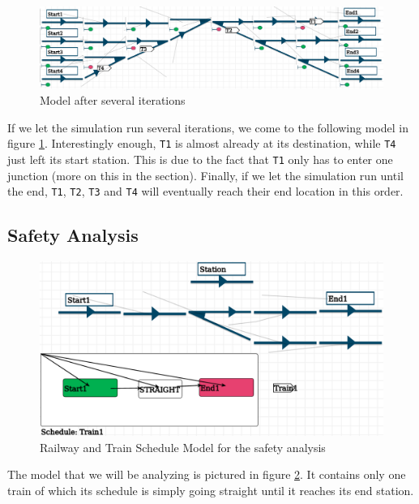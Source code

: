 \documentclass{article}
\begin{document}
\begin{figure}[H]
    \centering
    \includegraphics[width=\textwidth]{images/example_devs_after_few_iters.png}
    \caption{Model after several iterations}
    \label{example_devs_after_few_iters}
\end{figure}

If we let the simulation run several iterations, we come to the following model in figure \ref{example_devs_after_few_iters}. Interestingly enough, \texttt{T1} is almost already at its destination, while \texttt{T4} just left its start station. This is due to the fact that \texttt{T1} only has to enter one junction (more on this in the  section). Finally, if we let the simulation run until the end, \texttt{T1}, \texttt{T2}, \texttt{T3} and \texttt{T4} will eventually reach their end location in this order.

\subsection*{Safety Analysis}

\begin{figure}[H]
    \centering
    \includegraphics[width=\textwidth]{images/example_pn.png}
    \caption{Railway and Train Schedule Model for the safety analysis}
    \label{example_pn}
\end{figure}

The model that we will be analyzing is pictured in figure \ref{example_pn}. It contains only one train of which its schedule is simply going straight until it reaches its end station.
\end{document}
